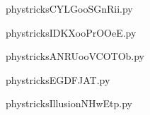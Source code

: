     

    \clearpage
    


    \newcommand{\CaptionFigCYLGooSGnRii}{<+Type your caption here+>}
    \begin{center}
        
    \end{center}
    phystricksCYLGooSGnRii.py

    

    \clearpage
    


    \newcommand{\CaptionFigIDKXooPrOOeE}{<+Type your caption here+>}
    \begin{center}
        
    \end{center}
    phystricksIDKXooPrOOeE.py

    

    \clearpage
    


    \newcommand{\CaptionFigANRUooVCOTOb}{<+Type your caption here+>}
    \begin{center}
        
    \end{center}
    phystricksANRUooVCOTOb.py

    

    \clearpage
    


    \newcommand{\CaptionFigEGDFJAT}{<+Type your caption here+>}
    \begin{center}
        
    \end{center}
    phystricksEGDFJAT.py

    

    \clearpage
    


    \newcommand{\CaptionFigIllusionNHwEtp}{<+Type your caption here+>}
    \begin{center}
        
    \end{center}
    phystricksIllusionNHwEtp.py

    

    \clearpage
    


